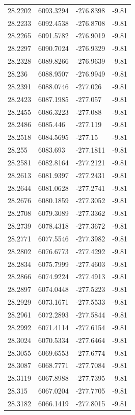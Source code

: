 \begin{table}[H]
\begin{tabular}{llll}
28.2202 & 6093.3294 & -276.8398 & -9.81 \\
28.2233 & 6092.4538 & -276.8708 & -9.81 \\
28.2265 & 6091.5782 & -276.9019 & -9.81 \\
28.2297 & 6090.7024 & -276.9329 & -9.81 \\
28.2328 & 6089.8266 & -276.9639 & -9.81 \\
28.236 & 6088.9507 & -276.9949 & -9.81 \\
28.2391 & 6088.0746 & -277.026 & -9.81 \\
28.2423 & 6087.1985 & -277.057 & -9.81 \\
28.2455 & 6086.3223 & -277.088 & -9.81 \\
28.2486 & 6085.446 & -277.119 & -9.81 \\
28.2518 & 6084.5695 & -277.15 & -9.81 \\
28.255 & 6083.693 & -277.1811 & -9.81 \\
28.2581 & 6082.8164 & -277.2121 & -9.81 \\
28.2613 & 6081.9397 & -277.2431 & -9.81 \\
28.2644 & 6081.0628 & -277.2741 & -9.81 \\
28.2676 & 6080.1859 & -277.3052 & -9.81 \\
28.2708 & 6079.3089 & -277.3362 & -9.81 \\
28.2739 & 6078.4318 & -277.3672 & -9.81 \\
28.2771 & 6077.5546 & -277.3982 & -9.81 \\
28.2802 & 6076.6773 & -277.4292 & -9.81 \\
28.2834 & 6075.7999 & -277.4603 & -9.81 \\
28.2866 & 6074.9224 & -277.4913 & -9.81 \\
28.2897 & 6074.0448 & -277.5223 & -9.81 \\
28.2929 & 6073.1671 & -277.5533 & -9.81 \\
28.2961 & 6072.2893 & -277.5844 & -9.81 \\
28.2992 & 6071.4114 & -277.6154 & -9.81 \\
28.3024 & 6070.5334 & -277.6464 & -9.81 \\
28.3055 & 6069.6553 & -277.6774 & -9.81 \\
28.3087 & 6068.7771 & -277.7084 & -9.81 \\
28.3119 & 6067.8988 & -277.7395 & -9.81 \\
28.315 & 6067.0204 & -277.7705 & -9.81 \\
28.3182 & 6066.1419 & -277.8015 & -9.81 \\

\end{tabular}
\end{table}
